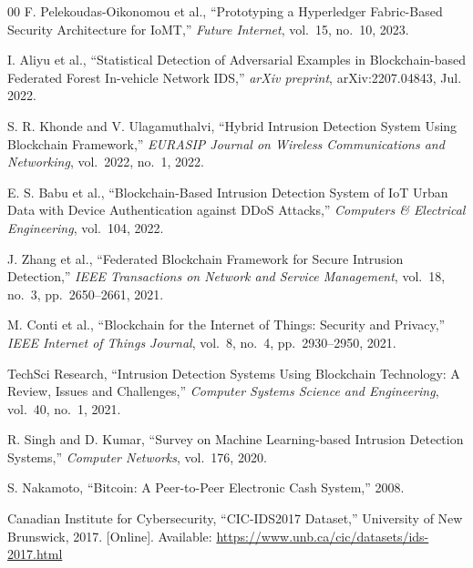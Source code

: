 \documentclass[conference]{IEEEtran}
\begin{document}
\begin{thebibliography}{00}
F. Pelekoudas-Oikonomou et al., ``Prototyping a Hyperledger Fabric-Based Security Architecture for IoMT,'' \textit{Future Internet}, vol.~15, no.~10, 2023.

I. Aliyu et al., ``Statistical Detection of Adversarial Examples in Blockchain-based Federated Forest In-vehicle Network IDS,'' \textit{arXiv preprint}, arXiv:2207.04843, Jul. 2022.

S. R. Khonde and V. Ulagamuthalvi, ``Hybrid Intrusion Detection System Using Blockchain Framework,'' \textit{EURASIP Journal on Wireless Communications and Networking}, vol.~2022, no.~1, 2022.

E. S. Babu et al., ``Blockchain-Based Intrusion Detection System of IoT Urban Data with Device Authentication against DDoS Attacks,'' \textit{Computers \& Electrical Engineering}, vol.~104, 2022.

J. Zhang et al., ``Federated Blockchain Framework for Secure Intrusion Detection,'' \textit{IEEE Transactions on Network and Service Management}, vol.~18, no.~3, pp.~2650--2661, 2021.

M. Conti et al., ``Blockchain for the Internet of Things: Security and Privacy,'' \textit{IEEE Internet of Things Journal}, vol.~8, no.~4, pp.~2930--2950, 2021.

TechSci Research, ``Intrusion Detection Systems Using Blockchain Technology: A Review, Issues and Challenges,'' \textit{Computer Systems Science and Engineering}, vol.~40, no.~1, 2021.

R. Singh and D. Kumar, ``Survey on Machine Learning-based Intrusion Detection Systems,'' \textit{Computer Networks}, vol.~176, 2020.

S. Nakamoto, ``Bitcoin: A Peer-to-Peer Electronic Cash System,'' 2008.

Canadian Institute for Cybersecurity, ``CIC-IDS2017 Dataset,'' University of New Brunswick, 2017. [Online]. Available: \url{https://www.unb.ca/cic/datasets/ids-2017.html}

\end{thebibliography}
\end{document}
